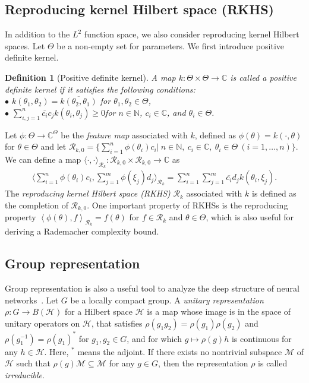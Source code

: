 \documentclass[twoside]{article}
\newtheorem{definition}[proposition]{Definition}
\def\mcl#1{\mathcal{#1}}
\def\bracket#1{\left\langle #1\right\rangle}
\def\hil{\mcl{H}}
\def\alg{\mcl{A}}
\def\modu{\mcl{M}}
\def\bbracket#1{\big\langle #1\big\rangle}
\def\Bbracket#1{\bigg\langle #1\bigg\rangle}
\begin{document}
\subsection{Reproducing kernel Hilbert space (RKHS)}
In addition to the $L^2$ function space, we also consider reproducing kernel Hilbert spaces.
Let $\Theta$ be a non-empty set for parameters.
We first introduce positive definite kernel.
\begin{definition}[Positive definite kernel]\label{def:pdk_rkhm}
 A map $k:\Theta\times \Theta\to\mathbb{C}$ is called a {\em positive definite kernel} if it satisfies the following conditions: \smallskip\\
$\bullet$ $k(\theta_1,\theta_2)=\overline{k(\theta_2,\theta_1)}$ \;for $\theta_1,\theta_2\in\Theta$,\\
$\bullet$ $\sum_{i,j=1}^n\overline{c_i}c_jk(\theta_i,\theta_j)\ge 0$\;for $n\in\mathbb{N}$, $c_i\in\mathbb{C}$, and $\theta_i\in\Theta$.
\end{definition}
Let $\phi: \Theta\to\mathbb{C}^{\Theta}$ be the {\em feature map} associated with $k$, defined as $\phi(\theta)=k(\cdot,\theta)$ for $\theta\in\Theta$ and let
$\mcl{R}_{k,0}=\{\sum_{i=1}^{n}\phi(\theta_i)c_i|\ n\in\mathbb{N},\ c_i\in\mathbb{C},\ \theta_i\in \Theta\ (i=1,\ldots,n)\}$.
We can define a map $\bbracket{\cdot,\cdot}_{\mcl{R}_k}:\mcl{R}_{k,0}\times \mcl{R}_{k,0}\to\mathbb{C}$ as
\begin{align*}
\Bbracket{\sum_{i=1}^{n}\phi(\theta_i)c_i,\sum_{j=1}^{m}\phi(\xi_j)d_j}_{\mcl{R}_k}=\sum_{i=1}^{n}\sum_{j=1}^{m}\overline{c_i}d_jk(\theta_i,\xi_j).
\end{align*}
The {\em reproducing kernel Hilbert space (RKHS)} $\mcl{R}_k$ associated with $k$ is defined as the completion of $\mcl{R}_{k,0}$. 
One important property of RKHSs is the reproducing property
$\bracket{\phi(\theta),f}_{\mcl{R}_k}=f(\theta)$
for $f\in\mcl{R}_{k}$ and $\theta\in \Theta$, which is also useful for deriving a Rademacher complexity bound.

 

\subsection{Group representation}
Group representation is also a useful tool to analyze the deep structure of neural networks~\citep{sonoda25ridgelet_deep}.
Let $G$ be a locally compact group. 
A {\em unitary representation} $\rho:G\to B(\hil)$ for a Hilbert space $\hil$ is a map whose image is in the space of unitary operators on $\hil$, that satisfies $\rho(g_1g_2)=\rho(g_1)\rho(g_2)$ and $\rho(g_1^{-1})=\rho(g_1)^*$ for $g_1,g_2\in G$, and for which $g\mapsto \rho(g)h$ is continuous for any $h\in\hil$.
Here, $^*$ means the adjoint.
If there exists no nontrivial subspace $\mcl{M}$ of $\hil$ such that $\rho(g)\mcl{M}\subseteq \mcl{M}$ for any $g\in G$, then the representation $\rho$ is called {\em irreducible}.
\end{document}
